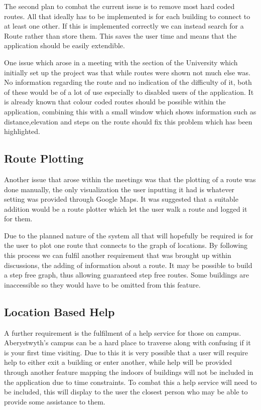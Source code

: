 The second plan to combat the current issue is to remove most hard coded routes. All that ideally has to be implemented is for each building to connect to at least one other. If this is implemented correctly we can instead search for a Route rather than store them. This saves the user time and means that the application should be easily extendible. 

One issue which arose in a meeting with the section of the University which initially set up the project was that while routes were shown not much else was. No information regarding the route and no indication of the difficulty of it, both of these would be of a lot of use especially to disabled users of the application. It is already known that colour coded routes should be possible within the application, combining this with a small window which shows information such as distance,elevation and steps on the route should fix this problem which has been highlighted. 
\subsection{Route Plotting}
Another issue that arose within the meetings was that the plotting of a route was done manually, the only visualization the user inputting it had is whatever setting was provided through Google Maps. It was suggested that a suitable addition would be a route plotter which let the user walk a route and logged it for them. 

Due to the planned nature of the system all that will hopefully be required is for the user to plot one route that connects to the graph of locations. By following this process we can fulfil another requirement that was brought up within discussions, the adding of information about a route. It may be possible to build a step free graph, thus allowing guaranteed step free routes. Some buildings are inaccessible so they would have to be omitted from this feature. 
\subsection{Location Based Help}
A further requirement is the fulfilment of a help service for those on campus. Aberystwyth's campus can be a hard place to traverse along with confusing if it is your first time visiting. Due to this it is very possible that a user will require help to either exit a building or enter another, while help will be provided through another feature mapping the indoors of buildings will not be included in the application due to time constraints. To combat this a help service will need to be included, this will display to the user the closest person who may be able to provide some assistance to them.

